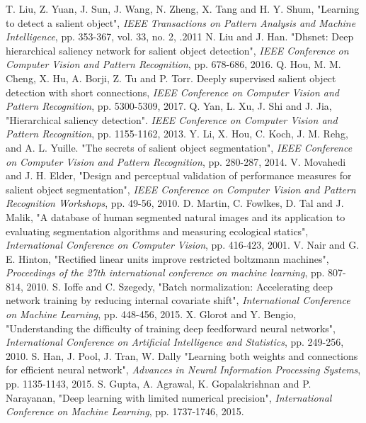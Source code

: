 \documentclass[a4paper,conference]{IEEEtran}
\begin{document}
\begin{thebibliography}{1}
T. Liu, Z. Yuan, J. Sun, J. Wang, N. Zheng, X. Tang and H. Y. Shum, "Learning to detect a salient object",  \emph{IEEE Transactions on Pattern Analysis and Machine Intelligence}, pp. 353-367, vol. 33, no. 2, .2011
N. Liu and J. Han. "Dhsnet: Deep hierarchical saliency network for salient object detection", \emph{IEEE Conference on Computer Vision and Pattern Recognition}, pp. 678-686, 2016.
Q. Hou, M. M. Cheng, X. Hu, A. Borji, Z. Tu and P. Torr. Deeply supervised salient object detection with short connections, \emph{IEEE Conference on Computer Vision and Pattern Recognition}, pp. 5300-5309, 2017.
Q. Yan, L. Xu, J. Shi and J. Jia, "Hierarchical saliency detection". \emph{IEEE Conference on Computer Vision and Pattern Recognition}, pp. 1155-1162, 2013.
Y. Li, X. Hou, C. Koch, J. M. Rehg, and A. L. Yuille. "The secrets of salient object segmentation", \emph{IEEE Conference on Computer Vision and Pattern Recognition}, pp. 280-287, 2014.
V. Movahedi and J. H. Elder, "Design and perceptual validation of performance measures for salient object segmentation", \emph{IEEE Conference on Computer Vision and Pattern Recognition Workshops}, pp. 49-56, 2010.
D. Martin, C. Fowlkes, D. Tal and J. Malik, "A database of human segmented natural images and its application to evaluating segmentation algorithms and measuring ecological statics", \emph{International Conference on Computer Vision}, pp. 416-423, 2001.
V. Nair and G. E. Hinton, "Rectified linear units improve restricted boltzmann machines", \emph{Proceedings of the 27th international conference on machine learning}, pp. 807-814, 2010.
S. Ioffe and C. Szegedy, "Batch normalization: Accelerating deep network training by reducing internal covariate shift", \emph{International Conference on Machine Learning}, pp. 448-456, 2015.
X. Glorot and Y. Bengio, "Understanding the difficulty of training deep feedforward neural networks", \emph{International Conference on Artificial Intelligence and Statistics}, pp. 249-256, 2010.
S. Han, J. Pool, J. Tran, W. Dally "Learning both weights and connections for efficient neural network",  \emph{Advances in Neural Information Processing Systems}, pp. 1135-1143, 2015.
S. Gupta, A. Agrawal, K. Gopalakrishnan and P. Narayanan, "Deep learning with limited numerical precision", \emph{International Conference on Machine Learning}, pp. 1737-1746, 2015.

\end{thebibliography}

\end{document}
